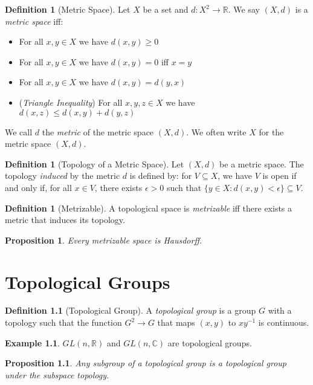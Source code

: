 \documentclass{book}
\newtheorem{prop}[ax]{Proposition}
\theoremstyle{definition}
\newtheorem{df}[ax]{Definition}
\newtheorem{ex}[ax]{Example}
\newcommand{\inv}[1]{\ensuremath{{#1}^{-1}}}
\begin{document}
\begin{df}[Metric Space]
Let $X$ be a set and $d : X^2 \rightarrow \mathbb{R}$. We say $(X,d)$ is a \emph{metric space} iff:
\begin{itemize}
\item For all $x,y \in X$ we have $d(x,y) \geq 0$
\item For all $x,y \in X$ we have $d(x,y) = 0$ iff $x = y$
\item For all $x,y \in X$ we have $d(x,y) = d(y,x)$
\item (\emph{Triangle Inequality}) For all $x,y,z \in X$ we have $d(x,z) \leq d(x,y) + d(y,z)$
\end{itemize}
We call $d$ the \emph{metric} of the metric space $(X,d)$. We often write $X$ for the metric space $(X,d)$.
\end{df}

\begin{df}[Topology of a Metric Space]
Let $(X,d)$ be a metric space. The topology \emph{induced} by the metric $d$ is defined by: for $V \subseteq X$, we have $V$ is open if and only if, for all $x \in V$, there exists $\epsilon > 0$ such that $\{ y \in X : d(x,y) < \epsilon \} \subseteq V$.
\end{df}

\begin{df}[Metrizable]
A topological space is \emph{metrizable} iff there exists a metric that induces its topology.
\end{df}

\begin{prop}
Every metrizable space is Hausdorff.
\end{prop}

\chapter{Topological Groups}

\begin{df}[Topological Group]
A \emph{topological group} is a group $G$ with a topology such that the function $G^2 \rightarrow G$ that maps $(x,y)$ to $x\inv{y}$ is continuous.
\end{df}

\begin{ex}
$GL(n,\mathbb{R})$ and $GL(n,\mathbb{C})$ are topological groups.
\end{ex}

\begin{prop}
Any subgroup of a topological group is a topological group under the subspace topology.
\end{prop}
\end{document}
